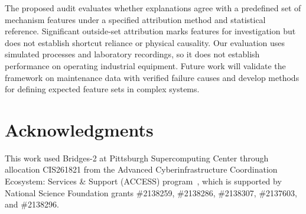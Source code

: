 \documentclass[conference]{IEEEtran}
\begin{document}

The proposed audit evaluates whether explanations agree with a predefined set of mechanism features under a specified attribution method and statistical reference. Significant outside-set attribution marks features for investigation but does not establish shortcut reliance or physical causality. Our evaluation uses simulated processes and laboratory recordings, so it does not establish performance on operating industrial equipment. Future work will validate the framework on maintenance data with verified failure causes and develop methods for defining expected feature sets in complex systems.



\section*{Acknowledgments}
This work used Bridges-2 at Pittsburgh Supercomputing Center through allocation CIS261821 from the Advanced Cyberinfrastructure Coordination Ecosystem: Services \& Support (ACCESS) program~\cite{boerner2023access}, which is supported by National Science Foundation grants \#2138259, \#2138286, \#2138307, \#2137603, and \#2138296. 
\end{document}
